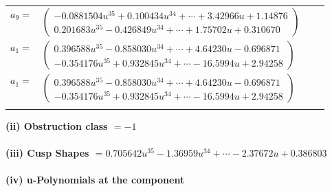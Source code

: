 \documentclass[1p]{elsarticle_modified}
\theoremstyle{definition}
\begin{document}
\begin{tabular}{m{7pt} m{180pt} m{7pt} m{180pt} }
\flushright $a_{9}=$&$\begin{pmatrix}-0.0881504 u^{35}+0.100434 u^{34}+\cdots+3.42966 u+1.14876\\0.201683 u^{35}-0.426849 u^{34}+\cdots+1.75702 u+0.310670\end{pmatrix}$ \\
\flushright $a_{1}=$&$\begin{pmatrix}0.396588 u^{35}-0.858030 u^{34}+\cdots+4.64230 u-0.696871\\-0.354176 u^{35}+0.932845 u^{34}+\cdots-16.5994 u+2.94258\end{pmatrix}$\\ \flushright $a_{1}=$&$\begin{pmatrix}0.396588 u^{35}-0.858030 u^{34}+\cdots+4.64230 u-0.696871\\-0.354176 u^{35}+0.932845 u^{34}+\cdots-16.5994 u+2.94258\end{pmatrix}$\\&\end{tabular}
\flushleft \textbf{(ii) Obstruction class $= -1$}\\~\\
\flushleft \textbf{(iii) Cusp Shapes $= 0.705642 u^{35}-1.36959 u^{34}+\cdots-2.37672 u+0.386803$}\\~\\
\newpage\renewcommand{\arraystretch}{1}
\flushleft \textbf{(iv) u-Polynomials at the component}\newline \\
\end{document}
